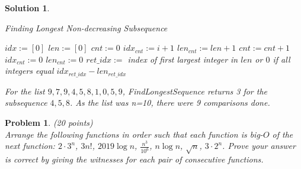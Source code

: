 \documentclass{article}
\theoremstyle{plain}
\newtheorem{problem}{Problem}
\theoremstyle{break}
\newtheorem{solution}{Solution}
\begin{document}
\begin{solution}
\begin{algorithm}
\caption{Finding Longest Non-decreasing Subsequence}
\begin{algorithmic}[1]
	\State $idx := [0]$
	\State $len := [0]$
	\State $cnt := 0$
			\State $idx_{cnt} := i+1$
			\State $len_{cnt} := len + 1$
		\Else
			\State $cnt := cnt + 1$
			\State $idx_{cnt} := 0$
			\State $len_{cnt} := 0$
		\EndIf
	\EndFor
	\State $ret\_idx :=$ index of first largest integer in $len$ or $0$ if all integers equal
	\State \Return $idx_{ret\_idx}-len_{ret\_idx}$
\EndProcedure
\end{algorithmic}
\end{algorithm}
For the list $9,7,9,4,5,8,1,0,5,9$, FindLongestSequence returns 3 for the subsequence $4,5,8$. As the list was n=10, there were 9 comparisons done.
\end{solution}

\newpage

\begin{problem} (20 points)\\
Arrange the following functions in order such that each function is big-$O$ of the next function:  $2\cdot3^n$, $3n!$, $2019\log{n}$, $\displaystyle \frac{n^3}{10^6}$, $n\log{n}$,  $\sqrt{n}$, $3\cdot2^n$.  Prove your answer is correct by giving the witnesses for each pair of consecutive functions.
\end{problem}
\end{document}
